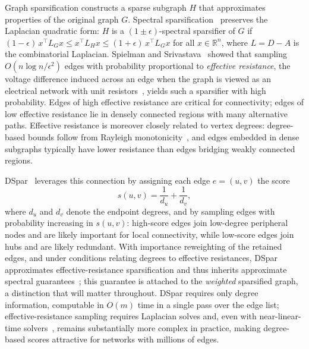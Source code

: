 \documentclass[10pt,journal,compsoc]{IEEEtran}
\begin{document}
Graph sparsification constructs a sparse subgraph $H$ that approximates properties of the original graph $G$.
Spectral sparsification~\cite{spielman2004nearly, spielman2008graph} preserves the Laplacian quadratic form: $H$ is a $(1 \pm \epsilon)$-spectral sparsifier of $G$ if $(1-\epsilon)\, x^\top L_G x \le x^\top L_H x \le (1+\epsilon)\, x^\top L_G x$ for all $x \in \mathbb{R}^n$, where $L = D - A$ is the combinatorial Laplacian.
Spielman and Srivastava~\cite{spielman2008graph} showed that sampling $O(n \log n / \epsilon^2)$ edges with probability proportional to \emph{effective resistance}, the voltage difference induced across an edge when the graph is viewed as an electrical network with unit resistors~\cite{doyle1984random}, yields such a sparsifier with high probability.
Edges of high effective resistance are critical for connectivity; edges of low effective resistance lie in densely connected regions with many alternative paths.
Effective resistance is moreover closely related to vertex degrees: degree-based bounds follow from Rayleigh monotonicity~\cite{doyle1984random, lovasz1993random}, and edges embedded in dense subgraphs typically have lower resistance than edges bridging weakly connected regions.

DSpar~\cite{liu2023dspar} leverages this connection by assigning each edge $e=(u,v)$ the score
\begin{equation}
s(u,v) = \frac{1}{d_u} + \frac{1}{d_v},
\label{eq:dspar-score}
\end{equation}
where $d_u$ and $d_v$ denote the endpoint degrees, and by sampling edges with probability increasing in $s(u,v)$: high-score edges join low-degree peripheral nodes and are likely important for local connectivity, while low-score edges join hubs and are likely redundant.
With importance reweighting of the retained edges, and under conditions relating degrees to effective resistances, DSpar approximates effective-resistance sparsification and thus inherits approximate spectral guarantees~\cite{liu2023dspar}; this guarantee is attached to the \emph{weighted} sparsified graph, a distinction that will matter throughout.
DSpar requires only degree information, computable in $O(m)$ time in a single pass over the edge list; effective-resistance sampling requires Laplacian solves and, even with near-linear-time solvers~\cite{spielman2014nearly}, remains substantially more complex in practice, making degree-based scores attractive for networks with millions of edges.

\end{document}
